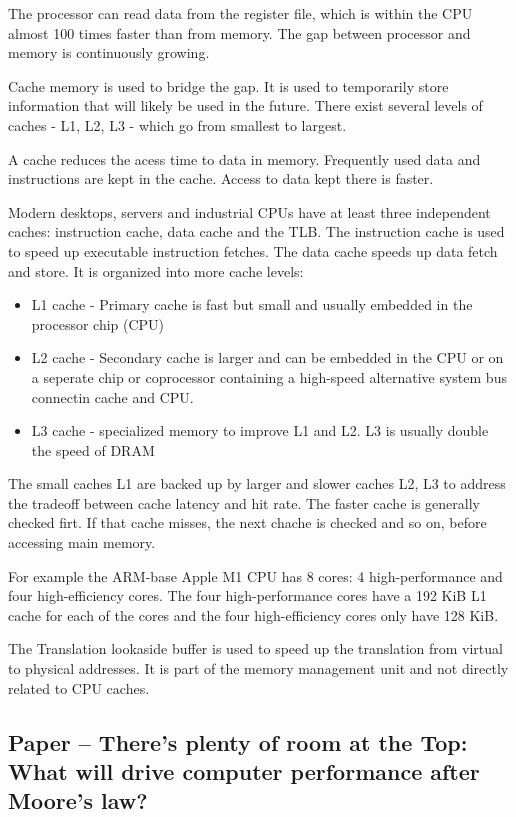 \documentclass[runningheads]{llncs}
\begin{document}
The processor can read data from the register file, which is within the CPU almost 100 times faster than from memory. 
The gap between processor and memory is continuously growing. 

Cache memory is used to bridge the gap. It is used to temporarily store information that will likely be used in the future. 
There exist several levels of caches -  L1, L2, L3 - which go from smallest to largest. 

A cache reduces the acess time to data in memory. Frequently used data and instructions are kept in the cache. 
Access to data kept there is faster.

Modern desktops, servers and industrial CPUs have at least three independent caches: instruction cache, data cache and the TLB. 
The instruction cache is used to speed up executable instruction fetches. The data cache speeds up data fetch and store. 
It is organized into more cache levels:
\begin{itemize}
	\item L1 cache - Primary cache is fast but small and usually embedded in the processor chip (CPU)
	\item L2 cache - Secondary cache is larger and can be embedded in the CPU or on a seperate chip or coprocessor containing 
	a high-speed alternative system bus connectin cache and CPU.
	\item L3 cache - specialized memory to improve L1 and L2. L3 is usually double the speed of DRAM
\end{itemize}
The small caches L1 are backed up by larger and slower caches L2, L3 to address the tradeoff between cache latency and hit rate. 
The faster cache is generally checked firt. If that cache misses, the next chache is checked and so on, before accessing main memory.

For example the ARM-base Apple M1 CPU has 8 cores: 4 high-performance and four high-efficiency cores. 
The four high-performance cores have a 192 KiB L1 cache for each of the cores and the four high-efficiency cores only have 128 KiB.

The Translation lookaside buffer is used to speed up the translation from virtual to physical addresses. 
It is part of the memory management unit and not directly related to CPU caches.


\subsection {Paper – There’s plenty of room at the Top: What will drive computer performance after Moore’s law?}
\end{document}
